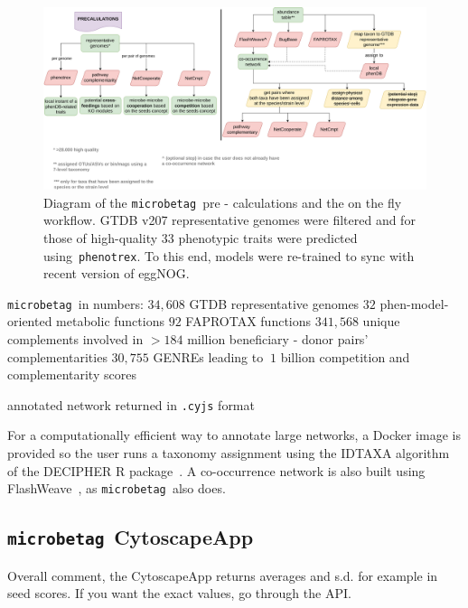 \documentclass[sn-mathphys,Numbered, lineno]{sn-jnl}  %
\theoremstyle{thmstyleone}%
\theoremstyle{thmstyletwo}%
\theoremstyle{thmstylethree}%
\newcommand{\microbetag}{\texttt{microbetag }}
\begin{document}
        \begin{figure}[H]
            \label{fig:wf}
            \includegraphics[width=0.9\columnwidth]{figs/microbetag-wf.png}
            \caption{
                Diagram of the \microbetag pre - calculations and the on the fly workflow. 
                GTDB v207 representative genomes were filtered and for those of high-quality
                33 phenotypic traits were predicted using~\texttt{phenotrex}.
                To this end, models were re-trained to sync with recent version of eggNOG.
            }
        \end{figure}


        \microbetag in numbers:
        $34,608$ GTDB representative genomes
        $32$ phen-model-oriented metabolic functions 
        $92$ FAPROTAX functions
        $341,568$ unique complements involved in $>184$ million beneficiary - donor pairs' complementarities
        $30,755$ GENREs leading to $~1$ billion competition and complementarity scores
        
        annotated network returned in \texttt{.cyjs} format


        For a computationally efficient way to annotate large networks, a Docker image is provided so the user runs a taxonomy assignment using the IDTAXA algorithm~\cite{murali2018idtaxa} of the DECIPHER R package~\cite{wright2016using}.
        A co-occurrence network is also built using FlashWeave~\cite{flashweave_cite}, as \microbetag also does. 
            

        

    \subsection*{\microbetag CytoscapeApp}
    \label{subsec:cytoapp}

        Overall comment, the CytoscapeApp returns averages and s.d. for example in seed scores. 
        If you want the exact values, go through the API. 
\end{document}
